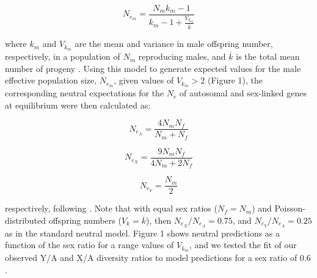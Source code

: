 \documentclass[9pt,twocolumn,twoside]{gsajnl}
\begin{document}
\begin{equation}
N_{e_{m}}=\frac{N_{m}k_{m}-1}{k_{m}-1+\frac{V_{k_{m}}}{\overline{k}}} \label{eq:Vk}
\end{equation}

where $k_{m}$ and $V_{k_{m}}$ are the mean and variance in male offspring number, respectively, in a population of $N_{m}$ reproducing males, and $\overline{k}$ is the total mean number of progeny \citep{kimura1964number}. Using this model to generate expected values for the male effective population size, $N_{e}_{m}$, given values of $V_{k_{m}} > 2$ (Figure 1), the corresponding neutral expectations for the $N_{e}$ of autosomal and sex-linked genes at equilibrium were then calculated as:

\begin{equation}
N_{e_{A}} = \frac{4N_{m}N_{f}}{N_{m}+N_{f}} \label{eq:Ne}
\end{equation}

\begin{equation}
N_{e_{X}} = \frac{9N_{m}N_{f}}{4N_{m}+2N_{f}} \label{eq:NeX}
\end{equation}

\begin{equation}
N_{e_{Y}} = \frac{N_{m}}{2} \label{eq:NeY}
\end{equation}

respectively, following \citep{wright1931evolution}. Note that with equal sex ratios ($N_{f} = N_{m}$) and Poisson-distributed offspring numbers ($V_{k} = \overline{k}$), then $N_{e_{X}}/N_{e_{A}} = 0.75$, and $N_{e_{Y}}/N_{e_{A}} = 0.25$ as in the standard neutral model. Figure 1 shows neutral predictions as a function of the sex ratio for a range values of $V_{k_{m}}$, and we tested the fit of our observed Y/A and X/A diversity ratios to model predictions for a sex ratio of 0.6 \citep{pickup2013influence}.
\end{document}
